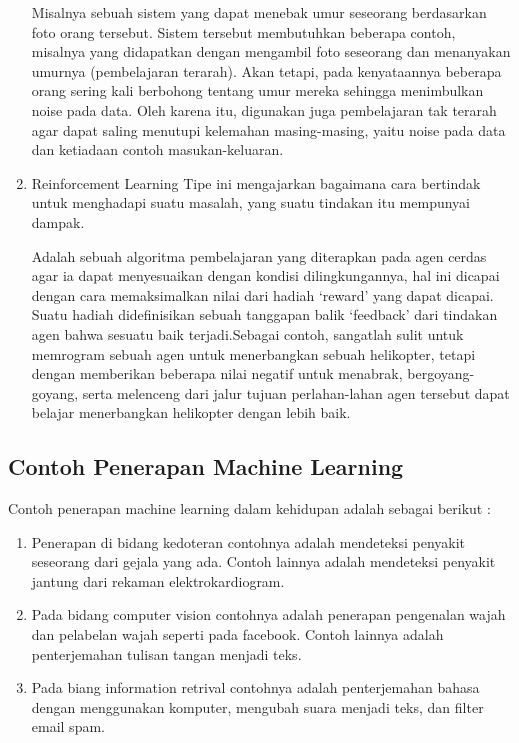 \begin{enumerate}
       \par Misalnya sebuah sistem yang dapat menebak umur seseorang berdasarkan foto orang tersebut.  Sistem tersebut membutuhkan beberapa contoh, misalnya yang didapatkan dengan mengambil foto seseorang dan menanyakan umurnya (pembelajaran terarah). Akan tetapi, pada kenyataannya beberapa orang sering kali berbohong tentang umur mereka sehingga menimbulkan noise pada data. Oleh karena itu, digunakan juga pembelajaran tak terarah agar dapat saling menutupi kelemahan masing-masing, yaitu noise pada data dan ketiadaan contoh masukan-keluaran.
 \item Reinforcement Learning Tipe ini mengajarkan bagaimana cara bertindak untuk menghadapi suatu masalah, yang suatu tindakan itu mempunyai dampak. 
       \par Adalah sebuah algoritma pembelajaran yang diterapkan pada agen cerdas agar ia dapat menyesuaikan dengan kondisi dilingkungannya, hal ini dicapai dengan cara memaksimalkan nilai dari hadiah ‘reward’ yang dapat dicapai. Suatu hadiah didefinisikan sebuah tanggapan balik ‘feedback’ dari tindakan agen bahwa sesuatu baik terjadi.Sebagai contoh, sangatlah sulit untuk memrogram sebuah agen untuk menerbangkan sebuah helikopter, tetapi dengan memberikan beberapa nilai negatif untuk menabrak, bergoyang-goyang, serta melenceng dari jalur tujuan perlahan-lahan agen tersebut dapat belajar menerbangkan helikopter dengan lebih baik.
\end{enumerate}

\subsection{Contoh Penerapan Machine Learning}
 Contoh penerapan machine learning dalam kehidupan adalah sebagai berikut :
\begin{enumerate}
 \item Penerapan di bidang kedoteran contohnya adalah mendeteksi penyakit seseorang dari gejala yang ada. Contoh lainnya adalah mendeteksi penyakit jantung dari rekaman elektrokardiogram.
 \item Pada bidang computer vision contohnya adalah penerapan pengenalan wajah dan pelabelan wajah seperti pada facebook. Contoh lainnya adalah penterjemahan tulisan tangan menjadi teks.
 \item Pada biang information retrival contohnya adalah penterjemahan bahasa dengan menggunakan komputer, mengubah suara menjadi teks, dan filter email spam.
\end{enumerate}

